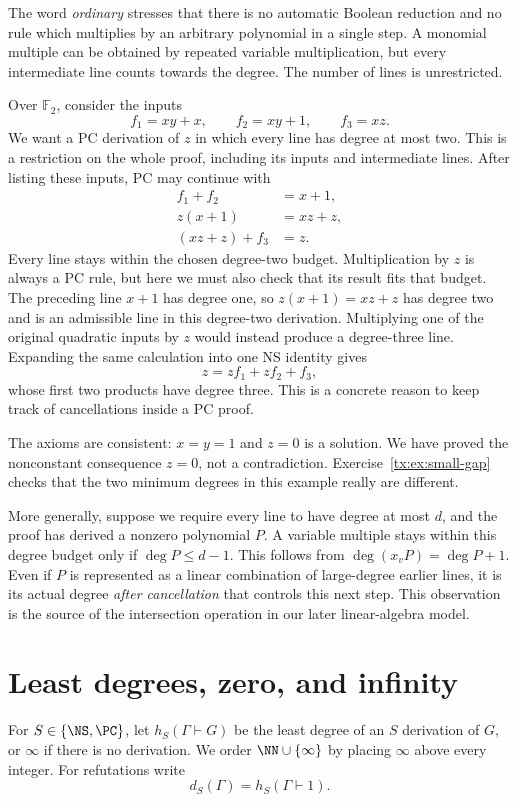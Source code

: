 The word \emph{ordinary} stresses that there is no automatic Boolean
reduction and no rule which multiplies by an arbitrary polynomial in a
single step. A monomial multiple can be obtained by repeated variable
multiplication, but every intermediate line counts towards the degree.
The number of lines is unrestricted.

\begin{example}\label{tx:eg:cancellation}
Over $\mathbb F_2$, consider the inputs
\[
                   f_1=xy+x,\qquad f_2=xy+1,\qquad f_3=xz.
\]
We want a PC derivation of $z$ in which every line has degree at most
two. This is a restriction on the whole proof, including its inputs and
intermediate lines. After listing these inputs, PC may continue with
\begin{align*}
 f_1+f_2&=x+1,\\
 z(x+1)&=xz+z,\\
 (xz+z)+f_3&=z.
\end{align*}
Every line stays within the chosen degree-two budget. Multiplication
by $z$ is always a PC rule, but here we must also check that its result
fits that budget. The preceding line $x+1$ has degree one, so
$z(x+1)=xz+z$ has degree two and is an admissible line in this
degree-two derivation. Multiplying one of the original quadratic inputs
by $z$ would instead produce a degree-three line. Expanding the same calculation into
one NS identity gives
\[
                          z=zf_1+zf_2+f_3,
\]
whose first two products have degree three. This is a concrete reason to
keep track of cancellations inside a PC proof.

The axioms are consistent: $x=y=1$ and $z=0$ is a solution. We have
proved the nonconstant consequence $z=0$, not a contradiction.
Exercise~\ref{tx:ex:small-gap} checks that the two minimum degrees in
this example really are different.
\end{example}

More generally, suppose we require every line to have degree at most
$d$, and the proof has derived a nonzero polynomial $P$. A variable
multiple stays within this degree budget only if $\deg P\le d-1$. This follows from
$\deg(x_vP)=\deg P+1$. Even if $P$ is represented as a linear combination
of large-degree earlier lines, it is its actual degree \emph{after
cancellation} that controls this next step. This observation is the
source of the intersection operation in our later linear-algebra model.

\section{Least degrees, zero, and infinity}
\begin{definition}\label{tx:def:least-degree}
For $S\in\{\NS,\PC\}$, let $h_S(\Gamma\vdash G)$ be the least degree
of an $S$ derivation of $G$, or $\infty$ if there is no derivation.
We order $\NN\cup\{\infty\}$ by placing $\infty$ above every integer.
For refutations write
\[
                      d_S(\Gamma)=h_S(\Gamma\vdash1).
\]
\end{definition}

